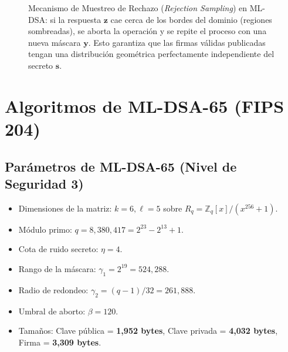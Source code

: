\documentclass[11pt,a4paper,twoside,openright]{book}
\theoremstyle{plain}
\theoremstyle{definition}
\theoremstyle{remark}
\newcommand{\Zq}{\mathbb{Z}_q}
\newcommand{\Rq}{R_q}
\newcommand{\vv}[1]{\mathbf{#1}}
\newcommand{\MLDSA}{\textsf{ML-DSA}}
\begin{document}
\begin{figure}[H]
\centering
{}
\caption{Mecanismo de Muestreo de Rechazo (\emph{Rejection Sampling}) en \MLDSA{}: si la respuesta $\vv{z}$ cae cerca de los bordes del dominio (regiones sombreadas), se aborta la operaci\'on y se repite el proceso con una nueva m\'ascara $\vv{y}$. Esto garantiza que las firmas v\'alidas publicadas tengan una distribuci\'on geom\'etrica perfectamente independiente del secreto $\vv{s}$.}
\label{fig:rejection_sampling}
\end{figure}

\section{Algoritmos de \MLDSA{}-65 (FIPS 204)}

\subsection{Par\'ametros de \MLDSA{}-65 (Nivel de Seguridad 3)}
\begin{itemize}
  \item Dimensiones de la matriz: $k = 6, \ell = 5$ sobre $\Rq = \Zq[x]/(x^{256} + 1)$.
  \item M\'odulo primo: $q = 8,380,417 = 2^{23} - 2^{13} + 1$.
  \item Cota de ruido secreto: $\eta = 4$.
  \item Rango de la m\'ascara: $\gamma_1 = 2^{19} = 524,288$.
  \item Radio de redondeo: $\gamma_2 = (q - 1)/32 = 261,888$.
  \item Umbral de aborto: $\beta = 120$.
  \item Tama\~nos: Clave p\'ublica = \textbf{1,952 bytes}, Clave privada = \textbf{4,032 bytes}, Firma = \textbf{3,309 bytes}.
\end{itemize}
\end{document}
